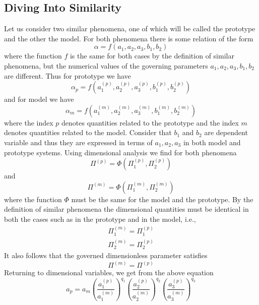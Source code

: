 	\subsection{Diving Into Similarity}
	Let us consider two similar phenomena, one of which will be called the prototype and the other the model. For both phenomena there is some relation of the form
	\begin{equation}
		\alpha = f(a_1, a_2, a_3, b_1, b_2)
	\end{equation}
	where the function $f$ is the same for both cases by the definition of similar phenomena, but the numerical values of the governing parameters $a_1, a_2, a_3, b_1, b_2$ are different. Thus for prototype we have
	\begin{equation}
		\alpha_p = f(a_1^{(p)}, a_2^{(p)}, a_3^{(p)}, b_1^{(p)}, b_2^{(p)})
	\end{equation}
	 and for model we have
 	\begin{equation}
		 \alpha_m = f(a_1^{(m)}, a_2^{(m)}, a_3^{(m)}, b_1^{(m)}, b_2^{(m)})
	 \end{equation}
	where the index $p$ denotes quantities related to the prototype and the index $m$ denotes quantities related to the model. Consider that $b_1$ and $b_2$ are dependent variable and thus they are expressed in terms of $a_1, a_2, a_3$ in both model and prototype systems. Using dimensional analysis we find for both phenomena
	\begin{equation}
		\Pi^{(p)} = \Phi(\Pi_1^{(p)}, \Pi_2^{(p)})
	\end{equation}
	and
	\begin{equation}
		\Pi^{(m)} = \Phi(\Pi_1^{(m)}, \Pi_2^{(m)})
	\end{equation}
	where the function $\Phi$ must be the same for the  model and the prototype. By the definition of similar phenomena the dimensional quantities must be identical in both the cases such as in the prototype and in the model, i.e.,
	\begin{align}
		\Pi_1^{(m)} = \Pi_1^{(p)} \\
		\Pi_2^{(m)} = \Pi_2^{(p)} 
	\end{align}
	It also follows that the governed dimensionless parameter satisfies
	\begin{equation}
		\Pi^{(m)} = \Pi^{(p)}
	\end{equation}
	Returning to dimensional variables, we get from the above equation
	\begin{equation}
		a_p = a_m \left(\frac{a_1^{(p)}}{a_1^{(m)}}\right)^{q_1} \left(\frac{a_2^{(p)}}{a_2^{(m)}}\right)^{q_2} \left(\frac{a_3^{(p)}}{a_3^{(m)}}\right)^{q_3}
	\end{equation}
